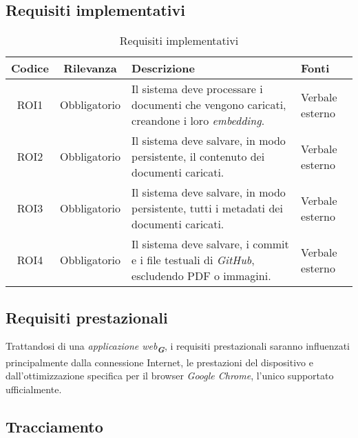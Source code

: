 \subsection{Requisiti implementativi}
\label{sec:Requisiti_implementativi}
\begin{table}[h!]
    \centering
    \renewcommand{\arraystretch}{1.6} %
    \begin{tabularx}{\textwidth}{|>{\centering\arraybackslash}c|>{\centering\arraybackslash}c|>{\centering\arraybackslash}X|>{\centering\arraybackslash}p{3cm}|} \hline
    \rowcolor[HTML]{FFD700} 
    \textbf{Codice} & \textbf{Rilevanza} & \textbf{Descrizione} & \textbf{Fonti} \\ \hline
    ROI1 & Obbligatorio & Il sistema deve processare i documenti che vengono caricati, creandone i loro \emph{embedding}. & Verbale esterno\\ \hline
    ROI2 & Obbligatorio & Il sistema deve salvare, in modo persistente, il contenuto dei documenti caricati. & Verbale esterno\\ \hline
    ROI3 & Obbligatorio & Il sistema deve salvare, in modo persistente, tutti i metadati dei documenti caricati. & Verbale esterno\\ \hline
    ROI4 & Obbligatorio & Il sistema deve salvare, i commit e i file testuali di \emph{GitHub}, escludendo PDF o immagini. & Verbale esterno\\ \hline
    \end{tabularx}
    \caption{Requisiti implementativi}
    \label{tab:Requisiti_implementativi}
\end{table}

\subsection{Requisiti prestazionali}
\label{sec:req_prestazionali}
Trattandosi di una \emph{applicazione web}\textsubscript{\textit{\textbf{G}}}, i requisiti prestazionali saranno influenzati principalmente dalla connessione Internet, 
le prestazioni del dispositivo e dall'ottimizzazione specifica per il browser \emph{Google Chrome}, l'unico supportato ufficialmente.

\newpage
\subsection{Tracciamento}
